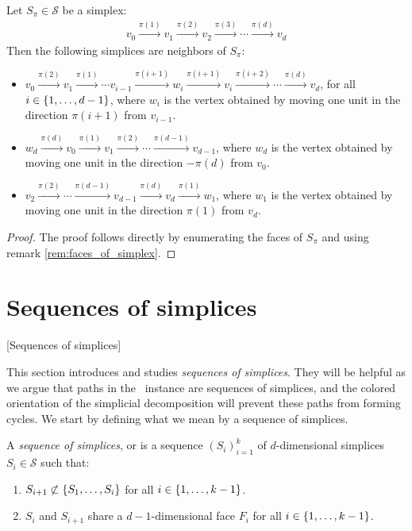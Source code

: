 \begin{lemma}
	Let $S_{\pi} \in \mathcal{S}$ be a simplex:
	\begin{align*}
		v_0 \xrightarrow{\pi(1)} v_1 \xrightarrow{\pi(2)} v_2 \xrightarrow{\pi(3)} \cdots \xrightarrow{\pi(d)} v_d
	\end{align*}
	Then the following simplices are neighbors of $S_{\pi}$:
	\begin{itemize}
		\item $v_0 \xrightarrow{\pi(2)} v_1 \xrightarrow{\pi(1)} \cdots v_{i-1} \xrightarrow{\pi(i+1)} w_i \xrightarrow{\pi(i+1)} v_{i} \xrightarrow{\pi(i+2)} \cdots \xrightarrow{\pi(d)} v_d$, for all $i \in \left\{1, \dots, d-1\right\}$, where $w_i$ is the vertex obtained by moving one unit in the direction $\pi(i+1)$ from $v_{i-1}$.
		\item $w_d \xrightarrow{\pi(d)} v_0 \xrightarrow{\pi(1)} v_1 \xrightarrow{\pi(2)} \cdots \xrightarrow{\pi(d-1)} v_{d-1}$, where $w_d$ is the vertex obtained by moving one unit in the direction $-\pi(d)$ from $v_{0}$.
		\item $v_2 \xrightarrow{\pi(2)} \cdots \xrightarrow{\pi(d-1)} v_{d-1} \xrightarrow{\pi(d)} v_d \xrightarrow{\pi(1)} w_1$, where $w_1$ is the vertex obtained by moving one unit in the direction $\pi(1)$ from $v_d$.
	\end{itemize}
\end{lemma}
\begin{proof}
	The proof follows directly by enumerating the faces of $S_{\pi}$ and using remark \ref{rem:faces_of_simplex}.
\end{proof}

\section{Sequences of simplices}[Sequences of simplices]

This section introduces and studies \emph{sequences of simplices}.  They will be helpful as we argue that paths in the \EndOfLine\ instance are sequences of simplices, and the colored orientation of the simplicial decomposition will prevent these paths from forming cycles. We start by defining what we mean by a sequence of simplices.

\begin{definition}
	\label{def:sequence_of_simplices}
	A \emph{sequence of simplices}, or  is a sequence $\left(S_i\right)_{i=1}^{k}$ of $d$-dimensional simplices $S_i \in \mathcal{S}$ such that:
	\begin{enumerate}
		\item $S_{i+1} \not\subset \left\{S_1, \dots, S_i\right\}$ for all $i \in \left\{1, \dots, k-1\right\}$.
		\item $S_i$ and $S_{i+1}$ share a $d-1$-dimensional face $F_i$ for all $i \in \left\{1, \dots, k-1\right\}$.
	\end{enumerate}
\end{definition}

